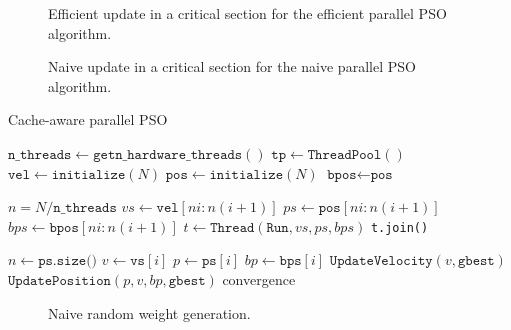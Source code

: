 \begin{figure}
  
  \caption{Efficient update in a critical section for the efficient parallel PSO
    algorithm.}
  \label{fig:efficient-update}
\end{figure}

\begin{figure}
  
  \caption{Naive update in a critical section for the naive parallel PSO
    algorithm.}
  \label{fig:naive-update}
\end{figure}

\begin{algorithm}
  \caption{Cache-aware parallel PSO}\label{alg:par-pso}
  \begin{algorithmic}[1]
    \State $\texttt{n\_threads} \gets \texttt{getn\_hardware\_threads}()$
    \State $\texttt{tp} \gets \texttt{ThreadPool}()$
    \State $\texttt{vel} \gets \texttt{initialize}(N)$
    \State $\texttt{pos} \gets \texttt{initialize}(N)$
    \State $\texttt{bpos} \gets \texttt{pos}$

    \State $n = N/\texttt{n\_threads}$ 
    \State $vs \gets \texttt{vel}[ni:n(i+1)]$
    \State $ps \gets \texttt{pos}[ni:n(i+1)]$
    \State $bps \gets \texttt{bpos}[ni:n(i+1)]$
    \State $t \gets \texttt{Thread}(\texttt{Run},vs, ps, bps)$
    \EndFor
    \State \texttt{t.join()}
    \EndFor
    \EndProcedure
  \end{algorithmic}
  \begin{algorithmic}[1]
    \State {}
    \State $n \gets \texttt{ps.size()}$
    \Repeat
    \State $v \gets \texttt{vs}[i]$
    \State $p \gets \texttt{ps}[i]$
    \State $bp \gets \texttt{bps}[i]$
    \State $\texttt{UpdateVelocity}(v, \texttt{gbest})$
    \State $\texttt{UpdatePosition}(p, v, bp, \texttt{gbest})$
    \EndFor
    \Until convergence
    \EndProcedure
  \end{algorithmic}
\end{algorithm}

\begin{figure}
  
  \caption{Naive random weight generation.}\label{fig:naive-par}
\end{figure}


